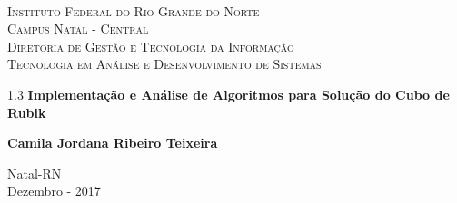 
\begin{titlepage}
	\begin{center}
		
		  
		\begin{minipage}{11.15cm}
			\begin{center}
				\begin{espacosimples}
					{\small \ \\
                       \textsc{Instituto Federal do Rio Grande do Norte}
                       \\
							  \textsc{Campus Natal - Central}					\\
							  \textsc{Diretoria de Gestão e Tecnologia da Informação}	   
							  \\
							  \textsc{Tecnologia em Análise e Desenvolvimento de Sistemas}}   	
                       \\
				\end{espacosimples}
			\end{center}
		\end{minipage}

			
		\vspace{6cm}
						
		{\setlength{\baselineskip}%
		{1.3\baselineskip}
		{\LARGE \textbf{Implementação e Análise de Algoritmos para Solução do Cubo de Rubik}}\par}
			
		\vspace{3cm}
			
		{\large \textbf{Camila Jordana Ribeiro Teixeira}}
						
		\vspace{6cm}
		
		Natal-RN\\ Dezembro - 2017
	\end{center}
\end{titlepage}